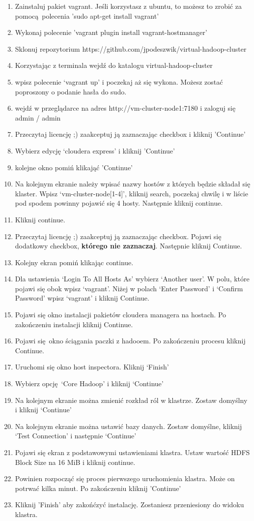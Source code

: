 \documentclass[11pt]{article}
\begin{document}
\begin{enumerate}
\item Zainstaluj pakiet vagrant. Jeśli korzystasz z ubuntu, to możesz to zrobić za pomocą polecenia 'sudo apt-get install vagrant'
\item Wykonaj polecenie 'vagrant plugin install vagrant-hostmanager'
\item Sklonuj repozytorium https://github.com/jpodeszwik/virtual-hadoop-cluster
\item Korzystając z terminala wejdź do katalogu virtual-hadoop-cluster
\item wpisz polecenie ‘vagrant up’ i poczekaj aż się wykona. Możesz zostać poproszony o podanie hasła do sudo.
\item wejdź w przeglądarce na adres http://vm-cluster-node1:7180 i zaloguj się admin / admin
\item Przeczytaj licencję ;) zaakceptuj ją zaznaczając checkbox i kliknij 'Continue'
\item Wybierz edycję ‘cloudera express’ i kliknij 'Continue'
\item kolejne okno pomiń klikająć 'Continue'
\item Na kolejnym ekranie należy wpisać nazwy hostów z których będzie składał się klaster. Wpisz ‘vm-cluster-node[1-4]’, kliknij search, poczekaj chwilę i w liście pod spodem powinny pojawić się 4 hosty. Następnie kliknij continue.
\item Kliknij continue.
\item Przeczytaj licencję ;) zaakceptuj ją zaznaczając checkbox. Pojawi się dodatkowy checkbox, \textbf{którego nie zaznaczaj}. Następnie kliknij Continue.
\item Kolejny ekran pomiń klikając continue.
\item Dla ustawienia ‘Login To All Hosts As’ wybierz ‘Another user’. W polu, które pojawi się obok wpisz ‘vagrant’. Niżej w polach ‘Enter Password’ i ‘Confirm Password’ wpisz ‘vagrant’ i kliknij Continue.
\item Pojawi się okno instalacji pakietów cloudera managera na hostach. Po zakończeniu instalacji kliknij Continue.
\item Pojawi się okno ściągania paczki z hadooem. Po zakończeniu procesu kliknij Continue.
\item Uruchomi się okno host inspectora. Kliknij ‘Finish’
\item Wybierz opcję ‘Core Hadoop’ i kliknij ‘Continue’
\item Na kolejnym ekranie można zmienić rozkład ról w klastrze. Zostaw domyślny i kliknij ‘Continue’
\item Na kolejnym ekranie można ustawić bazy danych. Zostaw domyślne, kliknij ‘Test Connection’ i następnie ‘Continue’
\item Pojawi się ekran z podstawowymi ustawieniami klastra. Ustaw wartość HDFS Block Size  na 16 MiB i kliknij continue.
\item Powinien rozpocząć się proces pierwszego uruchomienia klastra. Może on potrwać kilka minut. Po zakończeniu kliknij 'Continue'
\item Kliknij 'Finish' aby zakońćzyć instalację. Zostaniesz przeniesiony do widoku klastra.
\end{enumerate}
\end{document}
